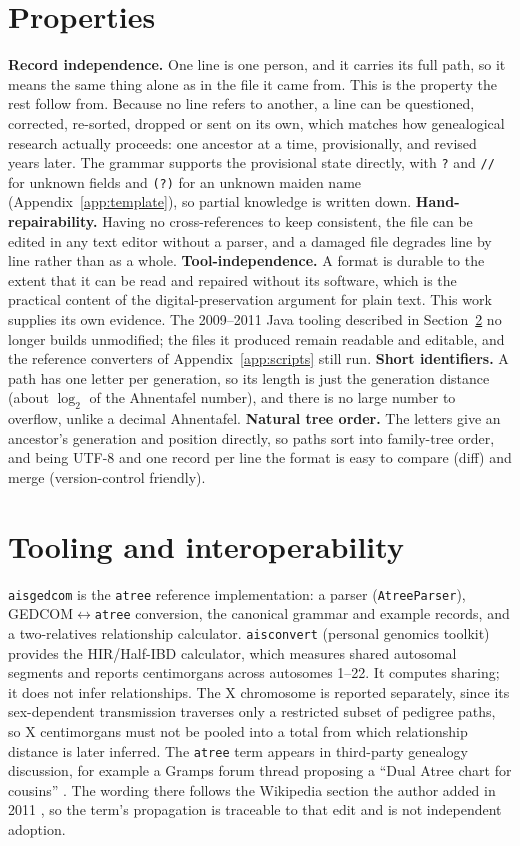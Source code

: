 \documentclass[11pt]{article}
\newcommand{\atree}{\texttt{atree}}
\begin{document}
\section{Properties}
\label{sec:properties}
\textbf{Record independence.} One line is one person, and it carries its full path, so it means the
same thing alone as in the file it came from. This is the property the rest follow from. Because no
line refers to another, a line can be questioned, corrected, re-sorted, dropped or sent on its own,
which matches how genealogical research actually proceeds: one ancestor at a time, provisionally, and
revised years later. The grammar supports the provisional state directly, with \texttt{?} and
\texttt{//} for unknown fields and \texttt{(?)} for an unknown maiden name (Appendix~\ref{app:template}),
so partial knowledge is written down. \textbf{Hand-repairability.} Having no
cross-references to keep consistent, the file can be edited in any text editor without a parser, and a
damaged file degrades line by line rather than as a whole. \textbf{Tool-independence.} A format is
durable to the extent that it can be read and repaired without its software, which is the practical
content of the digital-preservation argument for plain text. This work supplies its own evidence. The
2009--2011 Java tooling described in Section~\ref{sec:tooling} no longer builds unmodified; the files
it produced remain readable and editable, and the reference converters of Appendix~\ref{app:scripts}
still run. \textbf{Short identifiers.} A path has one letter per
generation, so its length is just the generation distance (about $\log_2$ of the Ahnentafel number),
and there is no large number to overflow, unlike a decimal Ahnentafel. \textbf{Natural tree order.}
The letters give an ancestor's generation and position directly, so paths sort into family-tree order,
and being UTF-8 and one record per line the format is easy to compare (diff) and merge
(version-control friendly).

\section{Tooling and interoperability}
\label{sec:tooling}
\texttt{aisgedcom} \cite{aisgedcom} is the \atree{} reference implementation: a parser
(\texttt{AtreeParser}), GEDCOM$\leftrightarrow$\atree{} conversion, the canonical grammar and example
records, and a two-relatives relationship calculator. \texttt{aisconvert} \cite{aisconvert} (personal
genomics toolkit) provides the HIR/Half-IBD calculator, which measures shared
autosomal segments and reports centimorgans across autosomes 1--22. It computes sharing; it does not
infer relationships. The X chromosome is reported separately, since its sex-dependent transmission
traverses only a restricted subset of pedigree paths, so X centimorgans must not be pooled into a
total from which relationship distance is later inferred. The \atree{} term appears in third-party genealogy
discussion, for example a Gramps forum thread proposing a ``Dual Atree chart for cousins''
\cite{gramps_atree}. The wording there follows the Wikipedia section the author added in 2011
\cite{wiki_gns}, so the term's propagation is traceable to that edit and is not independent adoption.
\end{document}
